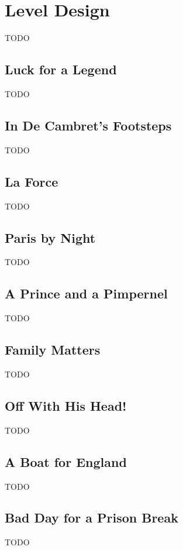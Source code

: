\chapter{Level Design}

TODO

\section{Luck for a Legend}

TODO

\section{In De Cambret's Footsteps}

TODO

\section{La Force}

TODO

\section{Paris by Night}

TODO

\section{A Prince and a Pimpernel}

TODO

\section{Family Matters}

TODO

\section{Off With His Head!}

TODO

\section{A Boat for England}

TODO

\section{Bad Day for a Prison Break}

TODO
